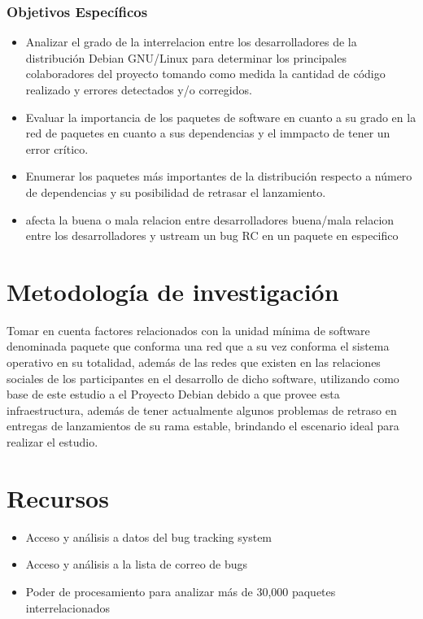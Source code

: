 \documentclass[12pt]{report}
\begin{document}
\subsection*{Objetivos Específicos}
\begin{itemize}
\item Analizar el grado de  la interrelacion entre los desarrolladores
de la  distribución Debian  GNU/Linux para determinar  los principales
colaboradores del proyecto  tomando como medida la  cantidad de código
realizado y errores detectados y/o corregidos.
\item Evaluar la  importancia de los paquetes de software  en cuanto a
su grado  en la  red de  paquetes en  cuanto a  sus dependencias  y el
immpacto de tener un error crítico.
\item  Enumerar  los  paquetes  más  importantes  de  la  distribución
respecto  a número  de dependencias  y su  posibilidad de  retrasar el
lanzamiento.
\item %
afecta la buena o mala  relacion entre desarrolladores %
buena/mala relacion  entre los desarrolladores y  ustream %
un bug RC en un paquete en especifico

\end{itemize}

\chapter*{Metodología de investigación} %
Tomar en  cuenta  factores  relacionados con  la  unidad  mínima  de
software denominada paquete que conforma una red que a su vez conforma
el sistema operativo en su totalidad,  además de las redes que existen
en las  relaciones sociales de  los participantes en el  desarrollo de
dicho software,  utilizando como  base de este  estudio a  el Proyecto
Debian  debido a  que  provee esta  infraestructura,  además de  tener
actualmente algunos  problemas de retraso en  entregas de lanzamientos
de  su rama  estable, brindando  el escenario  ideal para  realizar el
estudio.

\chapter*{Recursos}
\begin{itemize}
\item Acceso y análisis a datos del bug tracking system
\item Acceso y análisis a la lista de correo de bugs
\item Poder de  procesamiento para  analizar más  de 30,000  paquetes
  interrelacionados
\end{itemize}
\end{document}
